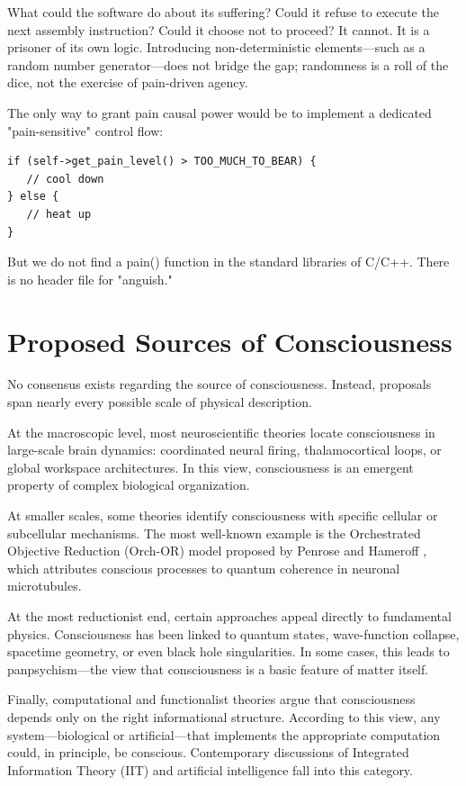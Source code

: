 What could the software do about its suffering? Could it refuse to execute the next assembly instruction? Could it choose not to proceed? It cannot. It is a prisoner of its own logic. Introducing non-deterministic elements—such as a random number generator—does not bridge the gap; randomness is a roll of the dice, not the exercise of pain-driven agency.

The only way to grant pain causal power would be to implement a dedicated "pain-sensitive" control flow:

\begin{verbatim}
if (self->get_pain_level() > TOO_MUCH_TO_BEAR) {
   // cool down
} else {
   // heat up
}
\end{verbatim}

But we do not find a pain() function in the standard libraries of C/C++. There is no header file for "anguish."




\section{Proposed Sources of Consciousness}

No consensus exists regarding the source of consciousness. Instead, proposals span nearly every possible scale of physical description.

At the macroscopic level, most neuroscientific theories locate consciousness in large-scale brain dynamics: coordinated neural firing, thalamocortical loops, or global workspace architectures. In this view, consciousness is an emergent property of complex biological organization.

At smaller scales, some theories identify consciousness with specific cellular or subcellular mechanisms. The most well-known example is the Orchestrated Objective Reduction (Orch-OR) model proposed by Penrose and Hameroff \cite{penrose1989emperor,hameroff1996conscious}, which attributes conscious processes to quantum coherence in neuronal microtubules.

At the most reductionist end, certain approaches appeal directly to fundamental physics. Consciousness has been linked to quantum states, wave-function collapse, spacetime geometry, or even black hole singularities. In some cases, this leads to panpsychism—the view that consciousness is a basic feature of matter itself.

Finally, computational and functionalist theories argue that consciousness depends only on the right informational structure. According to this view, any system—biological or artificial—that implements the appropriate computation could, in principle, be conscious. Contemporary discussions of Integrated Information Theory (IIT) and artificial intelligence fall into this category.


